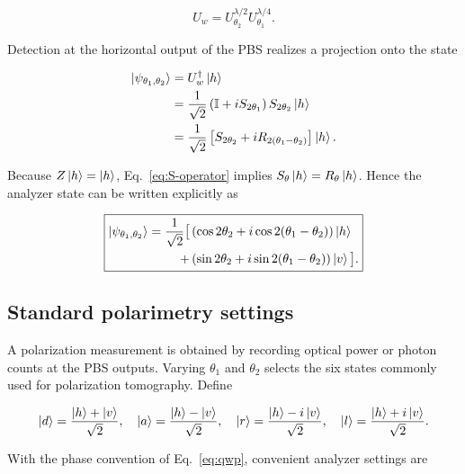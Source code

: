 \documentclass[a4paper,10pt]{article}
\newcommand{\I}{\mathbb{I}}
\begin{document}
\begin{equation}
    U_w=U^{\lambda/2}_{\theta_2}U^{\lambda/4}_{\theta_1}.
    \label{eq:analyzer-unitary}
\end{equation}

Detection at the horizontal output of the PBS realizes a projection onto the
state

\begin{align}
    \ket{\psi_{\theta_1,\theta_2}}
    &=U_w^\dagger\ket{h} \notag\\
    &=\frac{1}{\sqrt{2}}
      \left(\I+iS_{2\theta_1}\right)S_{2\theta_2}\ket{h} \notag\\
    &=\frac{1}{\sqrt{2}}
      \left[S_{2\theta_2}+iR_{2(\theta_1-\theta_2)}\right]\ket{h}.
    \label{eq:analyzer-state-compact}
\end{align}

Because $Z\ket{h}=\ket{h}$, Eq.~\eqref{eq:S-operator} implies
$S_\theta\ket{h}=R_\theta\ket{h}$. Hence the analyzer state can be written
explicitly as

\begin{equation}
    \boxed{
    \begin{aligned}
        \ket{\psi_{\theta_1,\theta_2}}
        =\frac{1}{\sqrt{2}}\big[&
        \left(\cos 2\theta_2
        +i\cos 2(\theta_1-\theta_2)\right)\ket{h}\\
        {}+&\left(\sin 2\theta_2
        +i\sin 2(\theta_1-\theta_2)\right)\ket{v}\big].
    \end{aligned}}
    \label{eq:analyzer-state}
\end{equation}

\subsection{Standard polarimetry settings}

A polarization measurement is obtained by recording optical power or photon
counts at the PBS outputs. Varying $\theta_1$ and $\theta_2$ selects the six states commonly
used for polarization tomography. Define

\begin{equation}
    \ket{d}=\frac{\ket{h}+\ket{v}}{\sqrt{2}},
    \quad
    \ket{a}=\frac{\ket{h}-\ket{v}}{\sqrt{2}},
    \quad
    \ket{r}=\frac{\ket{h}-i\ket{v}}{\sqrt{2}},
    \quad
    \ket{l}=\frac{\ket{h}+i\ket{v}}{\sqrt{2}}.
    \label{eq:polarization-states}
\end{equation}

With the phase convention of Eq.~\eqref{eq:qwp}, convenient analyzer settings
are
\end{document}
